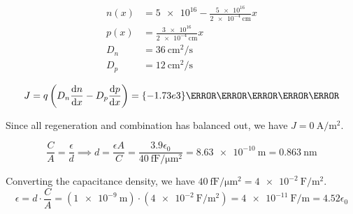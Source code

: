 \documentclass{article}
\begin{document}
\question{}

\begin{align}
  n(x) &= \num{5e16} - \frac{\num{5e16}}{\qty{2e-4}{\centi\meter}} x \\
  p(x) &= \frac{\num{3e16}}{\qty{2e-4}{\centi\meter}} x \\
  D_{n} &= \qty{36}{\centi\meter\squared\per\second} \\
  D_{p} &= \qty{12}{\centi\meter\squared\per\second}
\end{align}

\begin{subparts}
  \item
  \begin{equation}
    J = q \left(D_{n} \dv{n}{x} - D_{p} \dv{p}{x}\right) = \qty{-1.73e3}{\ampere\per\centi\meter\squared}
  \end{equation}
  \item Since all regeneration and combination has balanced out, we have \(J = \qty{0}{\ampere\per\meter\squared}\).
  \item
  \begin{equation}
    \frac{C}{A} = \frac{\epsilon}{d} \implies d = \frac{\epsilon A}{C} = \frac{3.9 \epsilon_{0}}{\qty{40}{\femto\farad\per\micro\meter\squared}} = \qty{8.63e-10}{\meter} = \qty{0.863}{\nano\meter}
  \end{equation}
  \item Converting the capacitance density, we have \(\qty{40}{\femto\farad\per\micro\meter\squared} = \qty{4e-2}{\farad\per\meter\squared}\).
  \begin{equation}
    \epsilon = d \cdot \frac{C}{A} = (\qty{1e-9}{\meter}) \cdot (\qty{4e-2}{\farad\per\meter\squared}) = \qty{4e-11}{\farad\per\meter} = \num{4.52} \epsilon_{0}
  \end{equation}
\end{subparts}
\end{document}
